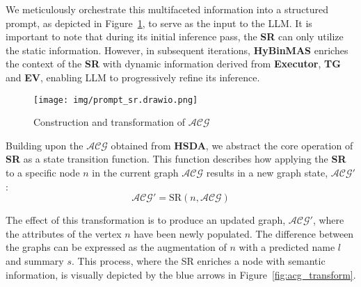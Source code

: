 \documentclass[acmsmall,screen,review,anonymous]{acmart} %
\begin{document}
We meticulously orchestrate this multifaceted information into a structured prompt, as depicted in Figure~\ref{fig:prompt_sr}, to serve as the input to the LLM. It is important to note that during its initial inference pass, the \textbf{SR} can only utilize the static information. However, in subsequent iterations, \textbf{HyBinMAS} enriches the context of the \textbf{SR} with dynamic information derived from \textbf{Executor}, \textbf{TG} and \textbf{EV}, enabling LLM to progressively refine its inference.

\begin{figure}[h] %
    \centering
    \texttt{[image: img/prompt\_sr.drawio.png]} %
    \caption{Construction and transformation of $\mathcal{ACG}$} %
    \label{fig:prompt_sr} %
\end{figure}


Building upon the $\mathcal{ACG}$ obtained from \textbf{HSDA}, we abstract the core operation of \textbf{SR} as a state transition function. This function describes how applying the \textbf{SR} to a specific node \(n\) in the current graph \(\mathcal{ACG}\) results in a new graph state, \(\mathcal{ACG}'\):
\begin{equation}
\label{eq:sr_transition}
\mathcal{ACG}' = \text{SR}(n, \mathcal{ACG})
\end{equation}

The effect of this transformation is to produce an updated graph, \(\mathcal{ACG}'\), where the attributes of the vertex \(n\) have been newly populated. The difference between the graphs can be expressed as the augmentation of \(n\) with a predicted name \(l\) and summary \(s\). This process, where the SR enriches a node with semantic information, is visually depicted by the blue arrows in Figure~\ref{fig:acg_transform}.

\end{document}
